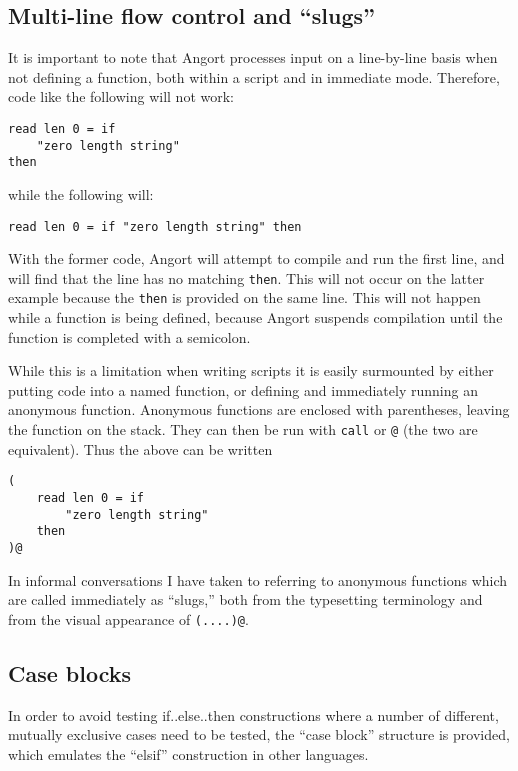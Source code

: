 \subsection{Multi-line flow control and ``slugs''}
\label{multilineflow}
It is important to note that Angort processes input on a line-by-line
basis when not defining a function, both within a script and in immediate
mode. Therefore, code like the following will not work:
\begin{lstlisting}
read len 0 = if
    "zero length string"
then
\end{lstlisting}
while the following will:
\begin{lstlisting}
read len 0 = if "zero length string" then
\end{lstlisting}
With the former code, Angort will attempt to compile and run the first line,
and will find that the line has no matching \texttt{then}. This will not
occur on the latter example because the \texttt{then} is provided on
the same line. This will not happen while a function is being defined,
because Angort suspends compilation until the function is completed
with a semicolon.

While this is a limitation when writing scripts it is easily surmounted
by either putting code into a named function, or defining and immediately
running an anonymous function. Anonymous functions are enclosed with 
parentheses, leaving the function on the stack. They can then be run
with \texttt{call} or \texttt{@} (the two are equivalent). Thus
the above can be written
\begin{lstlisting}
(
    read len 0 = if
        "zero length string"
    then
)@
\end{lstlisting}
In informal conversations I have taken to referring to anonymous
functions which are called immediately as ``slugs,'' both from
the typesetting terminology and from the visual appearance
of \texttt{(....)@}.


\subsection{Case blocks}
In order to avoid testing if..else..then constructions where a number of
different, mutually exclusive cases need to be tested, the ``case block''
structure is provided, which emulates the ``elsif'' construction in other
languages.


